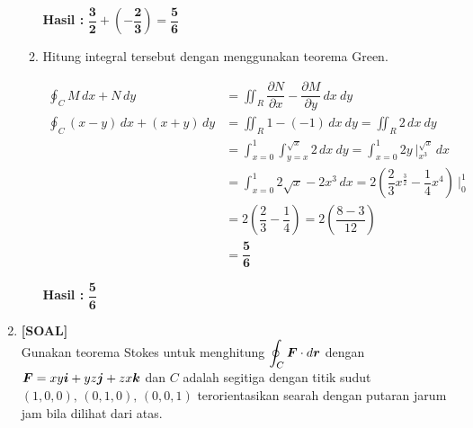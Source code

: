 \documentclass[a4paper,12pt]{article}
\begin{document}
\begin{enumerate}
\begin{enumerate}[start = 1]
        \textbf{Hasil :} $\mathbf{\dfrac{3}{2} + \left(-\dfrac{2}{3}\right) = \dfrac{5}{6}}$

        \item Hitung integral tersebut dengan menggunakan teorema Green.

        \begin{align*}
        \oint_{C} M\, dx + N\, dy & = \iint_{R} \dfrac{\partial{N}}{\partial{x}} - \dfrac{\partial{M}}{\partial{y}}\, dx\ dy\\
        \oint_{C} (x - y)\, dx + (x + y)\, dy & = \iint_{R} 1 - (-1)\, dx\ dy = \iint_{R} 2\, dx\ dy\\
        & = \int_{x = 0}^{1} \int_{y = x}^{\sqrt{x}} 2\, dx\ dy = \int_{x = 0}^{1} 2y\ \bigg|_{x^{3}}^{\sqrt{x}}\, dx\\
        & = \int_{x = 0}^{1} 2\sqrt{x} - 2x^{3}\, dx  = 2 \left(\dfrac{2}{3} x^{\frac{3}{2}} - \dfrac{1}{4} x^{4}\right)\ \bigg|_{0}^{1}\\
        & = 2\left(\dfrac{2}{3} - \dfrac{1}{4}\right) = 2\left(\dfrac{8 - 3}{12}\right)\\
        & = \mathbf{\dfrac{5}{6}}
        \end{align*}

        \textbf{Hasil :} $\mathbf{\dfrac{5}{6}}$
        
    \end{enumerate}
    \item \textbf{[SOAL]}\\
    Gunakan teorema Stokes untuk menghitung $\displaystyle\oint_C \vb*{F} \cdot d\vb*{r}$ dengan $\vb*{F}=xy\vb*{i} + yz\vb*{j} + zx\vb*{k}$ dan $C$ adalah segitiga dengan titik sudut $(1,0,0),\,(0,1,0),\,(0,0,1)$ terorientasikan searah dengan putaran jarum jam bila dilihat dari atas.


\end{enumerate}
\end{document}

